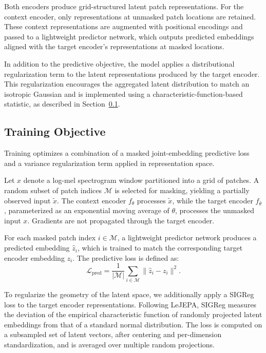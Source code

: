 \documentclass[10pt,twocolumn]{article}
\begin{document}
Both encoders produce grid-structured latent patch representations. For the context encoder, only representations at unmasked patch locations are retained. These context representations are augmented with positional encodings and passed to a lightweight predictor network, which outputs predicted embeddings aligned with the target encoder’s representations at masked locations.

In addition to the predictive objective, the model applies a distributional regularization term to the latent representations produced by the target encoder. This regularization encourages the aggregated latent distribution to match an isotropic Gaussian and is implemented using a characteristic-function-based statistic, as described in Section~\ref{sec:objective}.

\subsection{Training Objective}
\label{sec:objective}

Training optimizes a combination of a masked joint-embedding predictive loss and a variance regularization term applied in representation space.

Let $x$ denote a log-mel spectrogram window partitioned into a grid of patches. A random subset of patch indices $\mathcal{M}$ is selected for masking, yielding a partially observed input $\tilde{x}$. The context encoder $f_{\theta}$ processes $\tilde{x}$, while the target encoder $f_{\bar{\theta}}$, parameterized as an exponential moving average of $\theta$, processes the unmasked input $x$. Gradients are not propagated through the target encoder.

For each masked patch index $i \in \mathcal{M}$, a lightweight predictor network produces a predicted embedding $\hat{z}_i$, which is trained to match the corresponding target encoder embedding $z_i$. The predictive loss is defined as:
\[
\mathcal{L}_{\text{pred}} = \frac{1}{|\mathcal{M}|} \sum_{i \in \mathcal{M}} \lVert \hat{z}_i - z_i \rVert^2.
\]

To regularize the geometry of the latent space, we additionally apply a SIGReg loss to the target encoder representations. Following LeJEPA, SIGReg measures the deviation of the empirical characteristic function of randomly projected latent embeddings from that of a standard normal distribution. The loss is computed on a subsampled set of latent vectors, after centering and per-dimension standardization, and is averaged over multiple random projections.
\end{document}
